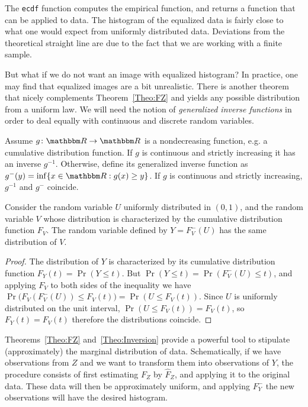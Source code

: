 The \verb|ecdf| function computes the empirical function, and returns a function that can be applied to data.
The histogram of the equalized data is fairly close to what one would expect from uniformly distributed data.
Deviations from the theoretical straight line are due to the fact that we are working with a finite sample.

But what if we do not want an image with equalized histogram?
In practice, one may find that equalized images are a bit unrealistic.
There is another theorem that nicely complements Theorem~\ref{Theo:FZ} and yields any possible distribution from a uniform law.
We will need the notion of \textit{generalized inverse functions} in order to deal equally with continuous and discrete random variables.

Assume $g\colon \mathbbm R \to \mathbbm R$ is a nondecreasing function, e.g. a cumulative distribution function.
If $g$ is continuous and strictly increasing it has an inverse $g^{-1}$.
Otherwise, define its generalized inverse function as $g^- (y) = \inf\{ x \in \mathbbm R : g(x)\geq y\}$.
If $g$ is continuous and strictly increasing, $g^{-1}$ and $g^-$ coincide.

\begin{theorem}\label{Theo:Inversion}
Consider the random variable $U$ uniformly distributed in $(0,1)$, and the random variable $V$ whose distribution is characterized by the cumulative distribution function $F_V$.
The random variable defined by $Y=F^-_V(U)$ has the same distribution of $V$.
\end{theorem}

\begin{proof}
The distribution of $Y$ is characterized by its cumulative distribution function $F_Y(t) = \Pr(Y \leq t)$.
But $\Pr(Y \leq t) = \Pr(F^-_V(U) \leq t)$, and applying $F_V$ to both sides of the inequality we have
$ \Pr\big(F_V(F^-_V(U)) \leq F_V(t)\big) = \Pr(U \leq F_V(t))$.
Since $U$ is uniformly distributed on the unit interval, $\Pr(U \leq F_V(t)) = F_V(t)$, so $F_Y(t) = F_V(t)$ therefore the distributions coincide.
\end{proof}

Theorems~\ref{Theo:FZ} and~\ref{Theo:Inversion} provide a powerful tool to stipulate (approximately) the marginal distribution of data.
Schematically, if we have observations from $Z$ and we want to transform them into observations of $Y$, the procedure consists of first estimating $F_Z$ by $\widehat F_Z$, and applying it to the original data.
These data will then be approximately uniform, and applying $F_Y^-$ the new observations will have the desired histogram.

